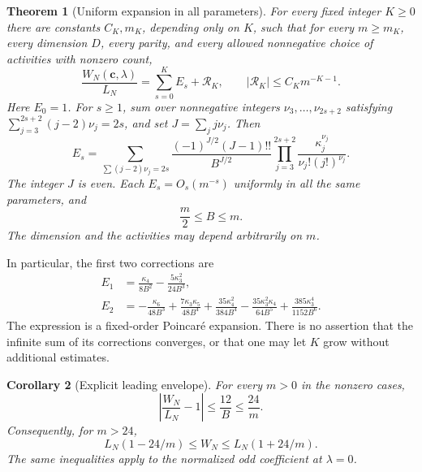 \documentclass[11pt,letterpaper]{article}
\newtheorem{theorem}{Theorem}[section]
\newtheorem{corollary}[theorem]{Corollary}
\theoremstyle{remark}\newtheorem{remark}[theorem]{Remark}
\begin{document}
\begin{theorem}[Uniform expansion in all parameters]\label{lcw:ulb:thm:global}
For every fixed integer $K\ge0$ there are constants $C_K,m_K$, depending
only on $K$, such that for every $m\ge m_K$, every dimension $D$, every
parity, and every allowed nonnegative choice of activities with nonzero
count,
\begin{equation}\label{lcw:ulb:eq:global}
 \frac{W_N(\boldsymbol c,\lambda)}{L_N}
 =\sum_{s=0}^{K} E_s+\mathcal R_K,
 \qquad |\mathcal R_K|\le C_K m^{-K-1}.
\end{equation}
Here $E_0=1$. For $s\ge1$, sum over nonnegative integers
$\nu_3,\ldots,\nu_{2s+2}$ satisfying
$\sum_{j=3}^{2s+2}(j-2)\nu_j=2s$, and set
$J=\sum_j j\nu_j$. Then
\begin{equation}\label{lcw:ulb:eq:Es}
 E_s=\sum_{\sum(j-2)\nu_j=2s}
 \frac{(-1)^{J/2}(J-1)!!}{B^{J/2}}
 \prod_{j=3}^{2s+2}\frac{\kappa_j^{\nu_j}}{\nu_j!(j!)^{\nu_j}}.
\end{equation}
The integer $J$ is even. Each $E_s=O_s(m^{-s})$ uniformly in all
the same parameters, and
\begin{equation}\label{lcw:ulb:eq:variance}
 \frac m2\le B\le m.
\end{equation}
The dimension and the activities may depend arbitrarily on $m$.
\end{theorem}

In particular, the first two corrections are
\begin{align}
 E_1&=\frac{\kappa_4}{8B^2}-\frac{5\kappa_3^2}{24B^3},
 \label{lcw:ulb:eq:E1}\\
 E_2&=-\frac{\kappa_6}{48B^3}
 +\frac{7\kappa_3\kappa_5}{48B^4}
 +\frac{35\kappa_4^2}{384B^4}
 -\frac{35\kappa_3^2\kappa_4}{64B^5}
 +\frac{385\kappa_3^4}{1152B^6}.
 \label{lcw:ulb:eq:E2}
\end{align}
The expression is a fixed-order Poincar\'e expansion. There is no
assertion that the infinite sum of its corrections converges, or that
one may let $K$ grow without additional estimates.

\begin{corollary}[Explicit leading envelope]\label{lcw:ulb:cor:explicit}
For every $m>0$ in the nonzero cases,
\begin{equation}\label{lcw:ulb:eq:explicit}
 \left|\frac{W_N}{L_N}-1\right|\le\frac{12}{B}\le\frac{24}{m}.
\end{equation}
Consequently, for $m>24$,
\[
 L_N(1-24/m)\le W_N\le L_N(1+24/m).
\]
The same inequalities apply to the normalized odd coefficient at
$\lambda=0$.
\end{corollary}
\end{document}

